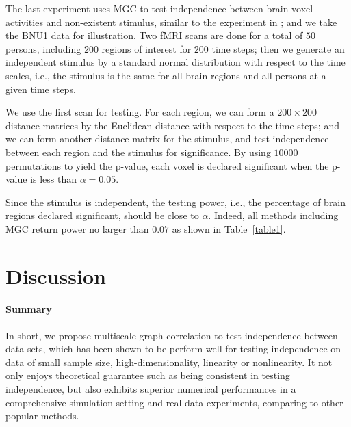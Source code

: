 \documentclass[11pt]{article}
\begin{document}

The last experiment uses MGC to test independence between brain voxel activities and non-existent stimulus, similar to the experiment in \cite{EklundKnutsson2012}; and we take the BNU1 data for illustration. Two fMRI scans are done for a total of $50$ persons, including $200$ regions of interest for $200$ time steps; then we generate an independent stimulus by a standard normal distribution with respect to the time scales, i.e., the stimulus is the same for all brain regions and all persons at a given time steps.

We use the first scan for testing. For each region, we can form a $200 \times 200$ distance matrices by the Euclidean distance with respect to the time steps; and we can form another distance matrix for the stimulus, and test independence between each region and the stimulus for significance. By using $10000$ permutations to yield the p-value, each voxel is declared significant when the p-value is less than $\alpha=0.05$. 

Since the stimulus is independent, the testing power, i.e., the percentage of brain regions declared significant, should be close to $\alpha$. Indeed, all methods including MGC return power no larger than $0.07$ as shown in Table~\ref{table1}.

\section{Discussion}
\label{conclu}

\paragraph{Summary}

In short, we propose multiscale graph correlation to test independence between data sets, which has been shown to be perform well for testing independence on data of small sample size, high-dimensionality, linearity or nonlinearity. It not only enjoys theoretical guarantee such as being consistent in testing independence, but also exhibits superior numerical performances in a comprehensive simulation setting and real data experiments, comparing to other popular methods.
\end{document}

